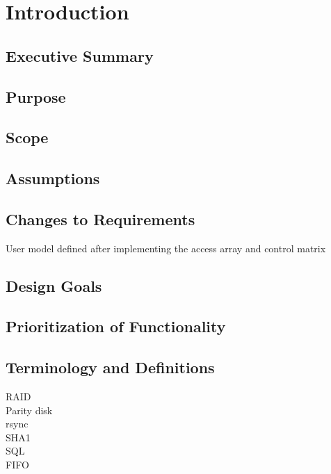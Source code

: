 \documentclass{report}
\begin{document}

\tableofcontents
\listoffigures
\listoftables
\chapter{Introduction} %
\label{ch:introduction}

\section{Executive Summary}

\section{Purpose}

\section{Scope}

\section{Assumptions}

\section{Changes to Requirements}

User model defined after implementing the access array and control matrix

\section{Design Goals}

\section{Prioritization of Functionality}

\section{Terminology and Definitions}
\begin{description}
\item[RAID]
\item[Parity disk]
\item[rsync]
\item[SHA1]
\item[SQL]
\item[FIFO]
\end{description}
\end{document}
